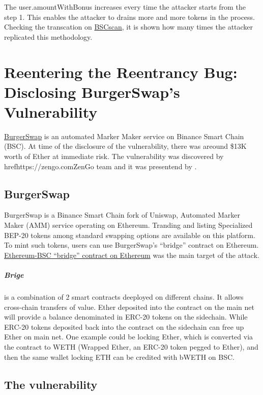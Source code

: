 The user.amountWithBonus increases every time the attacker starts from the step 1. 
This enables the attacker to drains more and more tokens in the process. 
Checking the transcation on \href{https://bscscan.com/txs?a=0x36ad9ee78bfb730955993d2aa77ecccf95e3313e&p=3}{BSCscan}, it is shown how many times the attacker 
replicated this methodology. 

\section{Reentering the Reentrancy Bug: Disclosing BurgerSwap's Vulnerability}   
\label{sec:Exploits:BurgerSwap}
\href{https://burgerswap.org/trade/swap}{BurgerSwap} is an automated Marker Maker service on Binance Smart Chain (BSC). 
At time of the disclosure of the vulnerability, there was areound \$13K worth of Ether at immediate risk.
The vulnerability was discovered by href{https://zengo.com}{ZenGo} team and it was presentend by \citet{BurgerSwap}.

\subsection{BurgerSwap}
\label{sec:BurgerSwap:brige}
BurgerSwap is a Binance Smart Chain fork of Uniswap, Automated Marker Maker (AMM) service operating on Ethereum. 
Tranding and listing Specialized BEP-20 tokens among standard swapping options are available on this platform. 
To mint such tokens, users can use 
BurgerSwap's “bridge” contract on Ethereum. 
\href{https://etherscan.io/address/0xaf5dcebba2f8bec8729117336b2fe8b4e0d99b0b#code}{Ethereum-BSC “bridge” contract on Ethereum} was the main target of the attack.

\subparagraph{Brige} is a combination of 2 smart contracts deeployed on different chains. 
It allows cross-chain transfers of value. Ether deposited into the contract on 
the main net will provide a balance denominated in ERC-20 tokens on the sidechain. 
While ERC-20 tokens deposited back into the contract on the sidechain can free up Ether on main net.
One example could be locking Ether, which is converted via the contract to WETH 
(Wrapped Ether, an ERC-20 token pegged to Ether), and then the same wallet locking ETH can be credited with bWETH on BSC.

\subsection{The vulnerability}
\label{sec:BurgerSwap:Vulnerability}

